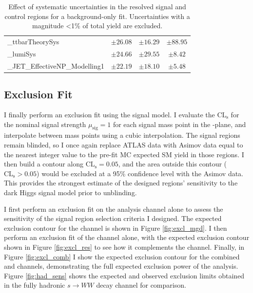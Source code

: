 \begin{table}
\begin{tabular*}{\textwidth}{@{\extracolsep{\fill}}lccc}
		\alpha\_ttbarTheorySys         & $\pm 26.08$          & $\pm 16.29$          & $\pm 88.95$       \\
		\alpha\_lumiSys         & $\pm 24.66$          & $\pm 29.55$          & $\pm 8.42$       \\
		\alpha\_JET\_EffectiveNP\_Modelling1         & $\pm 22.19$          & $\pm 18.10$          & $\pm 5.48$       \\
		\bottomrule
		\end{tabular*}
		\caption{Effect of systematic uncertainties in the resolved signal and control regions for a background-only fit. Uncertainties with a magnitude <1\% of total yield are excluded.}
		\label{tab:systs_res}
		\end{table}

\FloatBarrier
\subsection{Exclusion Fit}
I finally perform an exclusion fit using the signal model. I evaluate the $\text{CL}_\text{s}$ for the nominal signal strength $\mu_\text{sig} = 1$ for each signal mass point in the \ms-\mZp plane, and interpolate between mass points using a cubic interpolation. The signal regions remain blinded, so I once again replace ATLAS data with Asimov data equal to the nearest integer value to the pre-fit MC expected SM yield in those regions. I then build a contour along $\text{CL}_\text{s} = 0.05$, and the area outside this contour ($\text{CL}_\text{s} > 0.05$) would be excluded at a 95\% confidence level with the Asimov data. This provides the strongest estimate of the designed regions' sensitivity to the dark Higgs signal model prior to unblinding.

I first perform an exclusion fit on the \merged analysis channel alone to assess the sensitivity of the \merged signal region selection criteria I designed. The expected exclusion contour for the \merged channel is shown in Figure \ref{fig:excl_mgd}. I then perform an exclusion fit of the \resolved channel alone, with the expected exclusion contour shown in Figure \ref{fig:excl_res} to see how it complements the \merged channel. Finally, in Figure \ref{fig:excl_comb} I show the expected exclusion contour for the combined \merged and \resolved channels, demonstrating the full expected exclusion power of the analysis. Figure \ref{fig:had_sens} shows the expected and observed exclusion limits obtained in the fully hadronic $s\rightarrow WW$ decay channel for comparison.

